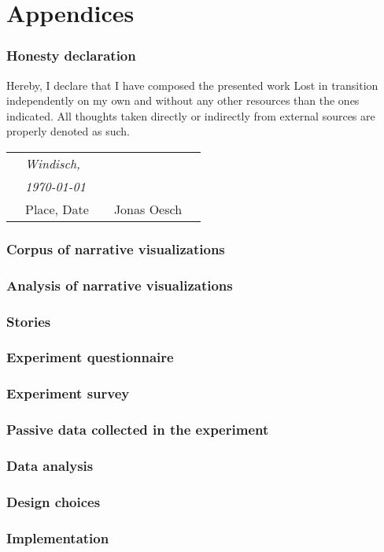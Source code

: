 \newpage
\appendix
\part{Appendices}

\section{Honesty declaration}
Hereby, I declare that I have composed the presented work Lost in transition independently on my own and without any other resources than the ones indicated. All thoughts taken directly or indirectly from external sources are properly denoted as such.
\vspace{3cm}

\centering
\begin{tabular}{p{10mm}>{\centering\arraybackslash}p{50mm}p{10mm}
>{\centering\arraybackslash}p{50mm}p{10mm}}
&\textit{\large Windisch,}&&& \\
&\textit{\large  \today}&&\hrulefill& \\
&\small Place, Date&&\small Jonas Oesch&
\end{tabular}

\newpage
\section{Corpus of narrative visualizations} \label{appendix-corpus}

\section{Analysis of narrative visualizations} \label{appendix-transition-analysis}

\section{Stories} \label{appendix-story}

\section{Experiment questionnaire} \label{appendix-questionnaire}

\section{Experiment survey} \label{appendix-survey}

\section{Passive data collected in the experiment} \label{appendix-passivedata}

\section{Data analysis} \label{appendix-dataanalysis}

\section{Design choices} \label{appendix-designchoices}

\section{Implementation} \label{appendix-implementation}

